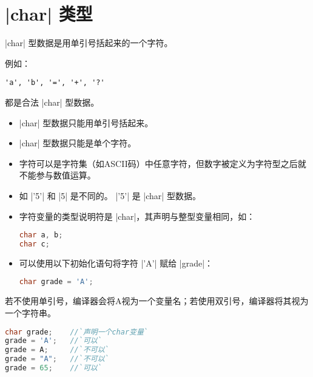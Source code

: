 \section{\lst|char| 类型}
\begin{frame}[fragile]\ft{\secname}
\begin{defn}{}
 \lst|char| 型数据是用单引号括起来的一个字符。
\end{defn}
例如：
\begin{lstlisting}
'a', 'b', '=', '+', '?'
\end{lstlisting}
都是合法 \lst|char| 型数据。
\end{frame}

\begin{frame}
\begin{itemize}
\item  \lst|char| 型数据只能用单引号括起来。\\[0.1in]
\item  \lst|char| 型数据只能是单个字符。\\[0.1in]
\item 字符可以是字符集（如ASCII码）中任意字符，但数字被定义为字符型之后就不能参与数值运算。\\[0.1in]
\item[] 如 \lst|'5'| 和 \lst|5| 是不同的。
  \lst|'5'| 是 \lst|char| 型数据。
\end{itemize}
\end{frame}

\begin{frame}[fragile]

  \begin{itemize}
  \item 字符变量的类型说明符是 \lst|char|，其声明与整型变量相同，如：
\begin{lstlisting}[language=C]
char a, b;
char c;
\end{lstlisting}

\item 可以使用以下初始化语句将字符 \lst|'A'| 赋给 \lst|grade|：
\begin{lstlisting}[language=C]
char grade = 'A';
\end{lstlisting}
  \end{itemize}


  \pause

  若不使用单引号，编译器会将A视为一个变量名；若使用双引号，编译器将其视为一个字符串。
\begin{lstlisting}[language=C]
char grade;    //`声明一个char变量`
grade = 'A';   //`可以`
grade = A;     //`不可以`
grade = "A";   //`不可以`
grade = 65;    //`可以` 
\end{lstlisting}
\end{frame}

